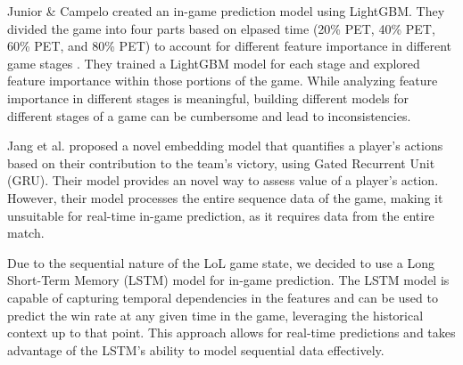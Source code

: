 \documentclass[11pt,a4paper,oneside]{report}
\newcommand{\instructions}[1]{{\color{orange}\itshape #1}}
\renewcommand{\instructions}[1]{}
\begin{document}
Junior \& Campelo \cite{junior-campelo-2023} created an in-game prediction model using LightGBM. They divided the game into four parts based on elpased time (20\% PET, 40\% PET, 60\% PET, and 80\% PET) to account for different feature importance in different game stages \cite{junior-campelo-2023}. They trained a LightGBM model for each stage and explored feature importance within those portions of the game. While analyzing feature importance in different stages is meaningful, building different models for different stages of a game can be cumbersome and lead to inconsistencies.

Jang et al. \cite{jang-woo-kim-2022} proposed a novel embedding model that quantifies a player's actions based on their contribution to the team's victory, using Gated Recurrent Unit (GRU). Their model provides an novel way to assess value of a player's action. However, their model processes the entire sequence data of the game, making it unsuitable for real-time in-game prediction, as it requires data from the entire match.

Due to the sequential nature of the LoL game state, we decided to use a Long Short-Term Memory (LSTM) model for in-game prediction. The LSTM model is capable of capturing temporal dependencies in the features and can be used to predict the win rate at any given time in the game, leveraging the historical context up to that point. This approach allows for real-time predictions and takes advantage of the LSTM's ability to model sequential data effectively.



\instructions{This section is obviously discipline specific so use the
  nomenclature that is common for your discipline. However, this section
  should provide sufficient detail about the materials and the methods
  used so that other experienced workers can repeat the experiment and
  obtain comparable results. Cite the appropriate literature when using a
  standard method or protocol and give only the details needed. Identify
  the materials used in the research. For example, computer systems used,
  mathematical theorems exploited, etc.; give information on the purity of
  all chemicals and reagents employed in the research; include the
  chemical/biological names of all compounds and chemical formulas of
  substances that are new or uncommon. Use standard systematic
  nomenclature to unambiguously define well-established compounds,
  processes, equipment, etc.}
\end{document}
